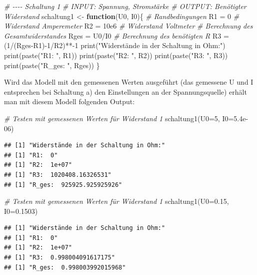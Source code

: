 \documentclass[
  9pt,
]{article}
\newenvironment{Shaded}{\begin{snugshade}}{\end{snugshade}}
\newcommand{\AttributeTok}[1]{\textcolor[rgb]{0.77,0.63,0.00}{#1}}
\newcommand{\CommentTok}[1]{\textcolor[rgb]{0.56,0.35,0.01}{\textit{#1}}}
\newcommand{\ControlFlowTok}[1]{\textcolor[rgb]{0.13,0.29,0.53}{\textbf{#1}}}
\newcommand{\DecValTok}[1]{\textcolor[rgb]{0.00,0.00,0.81}{#1}}
\newcommand{\FloatTok}[1]{\textcolor[rgb]{0.00,0.00,0.81}{#1}}
\newcommand{\FunctionTok}[1]{\textcolor[rgb]{0.00,0.00,0.00}{#1}}
\newcommand{\NormalTok}[1]{#1}
\newcommand{\OtherTok}[1]{\textcolor[rgb]{0.56,0.35,0.01}{#1}}
\newcommand{\SpecialCharTok}[1]{\textcolor[rgb]{0.00,0.00,0.00}{#1}}
\newcommand{\StringTok}[1]{\textcolor[rgb]{0.31,0.60,0.02}{#1}}
\begin{document}
\begin{Shaded}
\begin{Highlighting}[]
\CommentTok{\# {-}{-}{-}{-} Schaltung 1}
\CommentTok{\# INPUT: Spannung, Stromstärke}
\CommentTok{\# OUTPUT: Benötigter Widerstand}
\NormalTok{schaltung1 }\OtherTok{\textless{}{-}} \ControlFlowTok{function}\NormalTok{(U0, I0)\{}
  \CommentTok{\# Randbedingungen}
\NormalTok{  R1 }\OtherTok{=} \DecValTok{0} \CommentTok{\# Widerstand Amperemeter}
\NormalTok{  R2 }\OtherTok{=} \FloatTok{10e6} \CommentTok{\# Widerstand Voltmeter}
  \CommentTok{\# Berechnung des Gesamtwiderstandes}
\NormalTok{  Rges }\OtherTok{=}\NormalTok{ U0}\SpecialCharTok{/}\NormalTok{I0}
  \CommentTok{\# Berechnung des benötigten R}
\NormalTok{  R3 }\OtherTok{=}\NormalTok{ (}\DecValTok{1}\SpecialCharTok{/}\NormalTok{(Rges}\SpecialCharTok{{-}}\NormalTok{R1)}\SpecialCharTok{{-}}\DecValTok{1}\SpecialCharTok{/}\NormalTok{R2)}\SpecialCharTok{**{-}}\DecValTok{1}
  \FunctionTok{print}\NormalTok{(}\StringTok{"Widerstände in der Schaltung in Ohm:"}\NormalTok{)}
  \FunctionTok{print}\NormalTok{(}\FunctionTok{paste}\NormalTok{(}\StringTok{"R1: "}\NormalTok{, R1))}
  \FunctionTok{print}\NormalTok{(}\FunctionTok{paste}\NormalTok{(}\StringTok{"R2: "}\NormalTok{, R2))}
  \FunctionTok{print}\NormalTok{(}\FunctionTok{paste}\NormalTok{(}\StringTok{"R3: "}\NormalTok{, R3))}
  \FunctionTok{print}\NormalTok{(}\FunctionTok{paste}\NormalTok{(}\StringTok{"R\_ges: "}\NormalTok{, Rges))}
\NormalTok{\}}
\end{Highlighting}
\end{Shaded}

Wird das Modell mit den gemessenen Werten ausgeführt (das gemessene U
und I entsprechen bei Schaltung a) den Einstellungen an der
Spannungsquelle) erhält man mit diesem Modell folgenden Output:

\begin{Shaded}
\begin{Highlighting}[]
\CommentTok{\# Testen mit gemessenen Werten für Widerstand 1}
\FunctionTok{schaltung1}\NormalTok{(}\AttributeTok{U0=}\DecValTok{5}\NormalTok{, }\AttributeTok{I0=}\FloatTok{5.4e{-}06}\NormalTok{)}
\end{Highlighting}
\end{Shaded}

\begin{verbatim}
## [1] "Widerstände in der Schaltung in Ohm:"
## [1] "R1:  0"
## [1] "R2:  1e+07"
## [1] "R3:  1020408.16326531"
## [1] "R_ges:  925925.925925926"
\end{verbatim}

\begin{Shaded}
\begin{Highlighting}[]
\CommentTok{\# Testen mit gemessenen Werten für Widerstand 1}
\FunctionTok{schaltung1}\NormalTok{(}\AttributeTok{U0=}\FloatTok{0.15}\NormalTok{, }\AttributeTok{I0=}\FloatTok{0.1503}\NormalTok{)}
\end{Highlighting}
\end{Shaded}

\begin{verbatim}
## [1] "Widerstände in der Schaltung in Ohm:"
## [1] "R1:  0"
## [1] "R2:  1e+07"
## [1] "R3:  0.998004091617175"
## [1] "R_ges:  0.998003992015968"
\end{verbatim}
\end{document}
